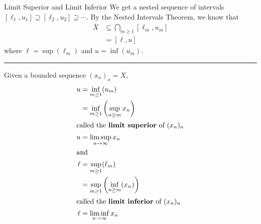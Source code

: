 \documentclass[8pt]{extarticle}
\begin{document}
\begin{problem}{Limit Superior and Limit Inferior}
    We get a nested sequence of intervals $[\ell_1,u_1]\supseteq [\ell_2,u_2]\supseteq \cdots$. By the Nested Intervals Theorem, we know that
    \begin{align*}
      \overline{X} &\subseteq \bigcap_{m\geq 1}[\ell_m,u_m]\\
                   &= [\ell,u]
    \end{align*}
    where $\ell = \sup(\ell_m)$ and $u = \inf(u_m)$.\\
    \vspace{4pt}
    \rule{\textwidth}{0.4pt}
    \vspace{4pt}
    Given a bounded sequence $(x_n)_x = X$,
    \begin{align*}
      u &= \inf_{m\geq 1}(u_m)\\
        &= \inf_{m\geq 1}\left(\sup_{n\geq m}x_n\right)\\
        \shortintertext{called the \textbf{limit superior} of $(x_n)_n$}
      u &= \limsup_{n\rightarrow\infty}x_n\\
      \shortintertext{and}
      \ell &= \sup_{m\geq 1}(\ell_m)\\
           &= \sup_{m\geq 1}\left(\inf_{n\geq m}(x_n)\right)\\
           \shortintertext{called the \textbf{limit inferior} of $(x_n)_n$}
      \ell &= \liminf_{n\rightarrow\infty}x_n
    \end{align*}
  \end{problem}
\end{document}

